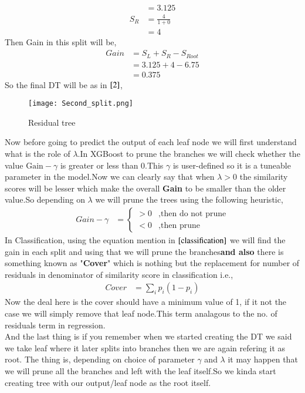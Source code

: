 \documentclass[journal,12pt,onecolumn]{IEEEtran}
\providecommand{\brak}[1]{\ensuremath{\left(#1\right)}}
\theoremstyle{remark}
\numberwithin{equation}{section}
\begin{document}
\begin{enumerate}
\begin{align}
				       &= 3.125 \\
				 S_{R} &= \frac{4}{1+ 0} \\
				       &= 4
                         \end{align}
                 Then Gain in this split will be,
		         \begin{align}
				 Gain &= S_{L} + S_{R} - S_{Root} \\
				      &= 3.125 + 4 - 6.75 \\
				      &= 0.375
		         \end{align}
		So the final DT will be as in $\ref{2}$,
		      \begin{figure}
			\centering
			\texttt{[image: Second\_split.png]}
			\caption{Residual tree}
			\label{2}
		      \end{figure}
		  Now before going to predict the output of each leaf node we will first understand what is the role of $\lambda$.In XGBoost to prune the branches we will check whether the value $\text{Gain} - \gamma$ is greater or less than 0.This $\gamma$ is user-defined so it is a tuneable parameter in the model.Now we can clearly say that when $\lambda > 0$ the similarity scores will be lesser which make the overall \textbf{Gain} to be smaller than the older value.So depending on $\lambda$ we will prune the trees using the following heuristic,
		   \begin{align}
			   Gain - \gamma &= \begin{cases}
				               >0 &, \text{then do not prune} \\
					       < 0 &, \text{then prune}
					     \end{cases}
                    \end{align}
		    In Classification, using the equation mention in $\eqref{classification}$ we will find the gain in each split and using that we will prune the branches\textbf{and also} there is something known as "\textbf{Cover}" which is nothing but the replacement for number of residuals in denominator of similarity score in classification i.e.,
		    \begin{align}
			    Cover &= \sum_ip_i\brak{1-p_i}
		    \end{align}
		    Now the deal here is the cover should have a minimum value of 1, if it not the case we will simply remove that leaf node.This term analagous to the no. of residuals term in regression.\\ 
		   And the last thing is if you remember when we started creating the DT we said we take leaf where it later splits into branches then we are again refering it as root. The thing is, depending on choice of parameter $\gamma$ and $\lambda$ it may happen that we will prune all the branches and left with the leaf itself.So we kinda start creating tree with our output/leaf node as the root itself.

\end{enumerate}
\end{document}
